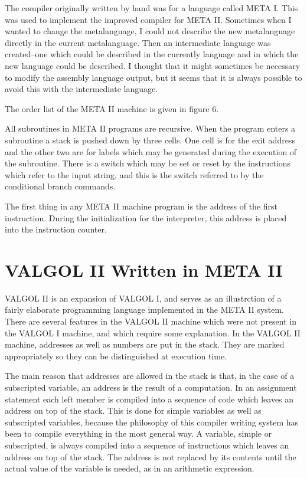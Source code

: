 \documentclass[notitlepage,twocolumn]{report}
\begin{document}
The compiler originally written by hand was for a language called META
I. This was used to implement the improved compiler for META
II. Sometimes when I wanted to change the metalanguage, I could not
describe the new metalanguage directly in the current
metalanguage. Then an intermediate language was created--one which
could be described in the currently language and in which the new
language could be described. I thought that it might sometimes be
necessary to modify the assembly language output, but it seems that it
is always possible to avoid this with the intermediate language.

The order list of the META II machine is given in figure 6.

All subroutines in META II programs are recursive. When the program
enters a subroutine a stack is pushed down by three cells. One cell is
for the exit address and the other two are for labels which may be
generated during the execution of the subroutine. There is a switch
which may be set or reset by the instructions which refer to the input
string, and this is the switch referred to by the conditional branch
commands.

The first thing in any META II machine program is the address of the
first instruction. During the initialization for the interpreter, this
address is placed into the instruction counter.


\section*{VALGOL II Written in META II}

VALGOL II is an expansion of VALGOL I, and serves as an illustrction
of a fairly elaborate programming language implemented in the META II
system. There are several features in the VALGOL II machine which were
not present in the VALGOL I machine, and which require some
explanation. In the VALGOL II machine, addresses as well as numbers
are put in the stack. They are marked appropriately so they can be
distinguished at execution time.

The main reason that addresses are allowed in the stack is that, in
the case of a subscripted variable, an address is the result of a
computation. In an assignment statement each left member is compiled
into a sequence of code which leaves an address on top of the
stack. This is done for simple variables as well as subscripted
variables, because the philosophy of this compiler writing system has
been to compile everything in the most general way. A variable, simple
or subscripted, is always compiled into a sequence of instructions
which leaves an address on top of the stack. The address is not
replaced by its contents until the actual value of the variable is
needed, as in an arithmetic expression.
\end{document}
